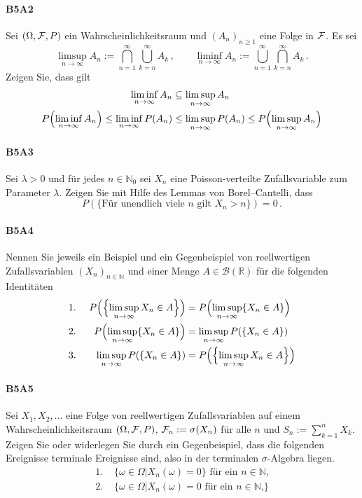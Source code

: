 \documentclass{article}
\begin{document}
\paragraph{B5A2}
Sei $(\Omega,{\cal F},P)$ ein Wahrscheinlichkeitsraum und $(A_n)_{n\geq 1}$ eine Folge in ${\cal F}$.
Es sei
\[
  \limsup_{n\to\infty}A_n:=\bigcap_{n=1}^\infty\bigcup_{k=n}^\infty A_k\,,\qquad\liminf_{n\to\infty}A_n:=\bigcup_{n=1}^\infty\bigcap_{k=n}^\infty A_k\,.
\]
Zeigen Sie, dass gilt
\begin{align*}
  \liminf_{n\to\infty}A_n
  &\subseteq\limsup_{n\to\infty}A_n\\
  P\Bigl(\liminf_{n\to\infty}A_n\Bigr)\leq \liminf_{n\to\infty}P(A_n)
  &\leq\limsup_{n\to\infty}P(A_n)\leq P\Bigl(\limsup_{n\to\infty}A_n\Bigr)
\end{align*}
\newpage

\paragraph{B5A3}
Sei $\lambda>0$ und für jedes $n\in\mathbb{N}_0$ sei $X_n$ eine Poisson-verteilte Zufallsvariable zum Parameter $\lambda$.
Zeigen Sie mit Hilfe des Lemmas von Borel--Cantelli, dass
\[
  P(\{\text{Für unendlich viele $n$ gilt $X_n>n$}\})=0\,.
\]
\newpage

\paragraph{B5A4}
Nennen Sie jeweils ein Beispiel und ein Gegenbeispiel von reellwertigen Zufallsvariablen $(X_n)_{n\in\mathbb{N}}$ und einer Menge $A\in\mathcal{B}(\mathbb{R})$ für die folgenden Identitäten
  \begin{alignat*}{2}
&\text{1.~}&P\Bigl(\Bigl\{\limsup_{n\to\infty}X_n\in A\Bigr\}\Bigr)&=P\Bigl(\limsup_{n\to\infty}\{X_n\in A\}\Bigr)\\
&\text{2.~}&P\Bigl(\limsup_{n\to\infty}\{X_n\in A\}\Bigr)&=\limsup_{n\to\infty}P(\{X_n\in A\})\\
&\text{3.~}&\limsup_{n\to\infty}P(\{X_n\in A\})&=P\Bigl(\Bigl\{\limsup_{n\to\infty}X_n\in A\Bigr\}\Bigr)
  \end{alignat*}
\newpage

\paragraph{B5A5}
Sei $X_1,X_2,\dots$ eine Folge von reellwertigen Zufallsvariablen auf einem Wahrscheinlichkeitsraum $(\Omega,{\cal F},P)$, ${\cal F}_n:=\sigma(X_n)$ für alle $n$ und $S_n:=\sum_{k=1}^nX_k$.
Zeigen Sie oder widerlegen Sie durch ein Gegenbeispiel, dass die folgenden Ereignisse terminale Ereignisse sind, also in der terminalen $\sigma$-Algebra liegen.
\begin{align*}
  \text{1.~}&\{\omega\in\Omega|X_n(\omega)=0\}\text{ für ein $n\in\mathbb{N}$,}\\
  \text{2.~}&\{\omega\in\Omega|X_n(\omega)=0\text{ für ein $n\in\mathbb{N}$,}\}
\end{align*}
\newpage


\end{document}
